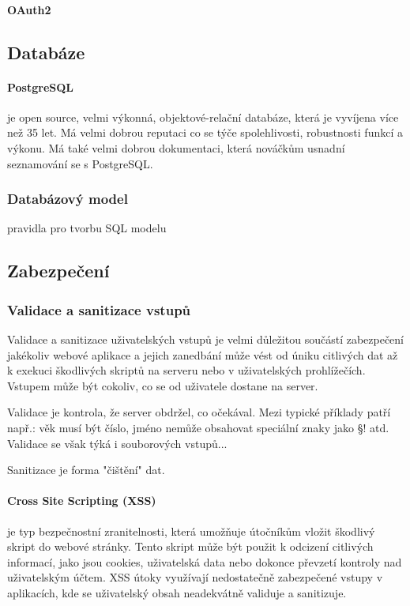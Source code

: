 \documentclass[12pt, a4paper]{article}
\begin{document}
\paragraph{OAuth2}
\subsection{Databáze}
\paragraph{PostgreSQL}
je open source, velmi výkonná, objektové-relační databáze, která je vyvíjena více než 35 let. Má velmi dobrou reputaci co se týče spolehlivosti, robustnosti funkcí a výkonu. Má také velmi dobrou dokumentaci, která nováčkům usnadní seznamování se s PostgreSQL.
\cite{postgresql_global_development_group_postgresql_2024}
\subsubsection{Databázový model}
pravidla pro tvorbu SQL modelu
\subsection{Zabezpečení}
\subsubsection{Validace a sanitizace vstupů}
Validace a sanitizace uživatelských vstupů je velmi důležitou součástí zabezpečení jakékoliv webové aplikace a jejich zanedbání může vést od úniku citlivých dat až k exekuci škodlivých skriptů na serveru nebo v uživatelských prohlížečích. Vstupem může být cokoliv, co se od uživatele dostane na server.

Validace je kontrola, že server obdržel, co očekával. Mezi typické příklady patří např.: věk musí být číslo, jméno nemůže obsahovat speciální znaky jako §! atd. Validace se však týká i souborových vstupů... 

Sanitizace je forma "čištění" dat.
\paragraph{Cross Site Scripting (XSS)}
je typ bezpečnostní zranitelnosti, která umožňuje útočníkům vložit škodlivý skript do webové stránky. Tento skript může být použit k odcizení citlivých informací, jako jsou cookies, uživatelská data nebo dokonce převzetí kontroly nad uživatelským účtem. XSS útoky využívají nedostatečně zabezpečené vstupy v aplikacích, kde se uživatelský obsah neadekvátně validuje a sanitizuje.
\end{document}
